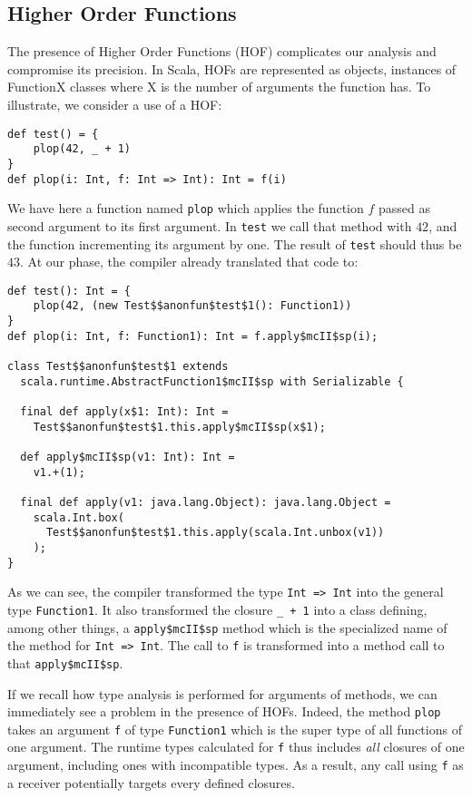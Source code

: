 \subsection{Higher Order Functions}
The presence of Higher Order Functions (HOF) complicates our analysis and
compromise its precision. In Scala, HOFs are represented as objects, instances
of FunctionX classes where X is the number of arguments the function has. To
illustrate, we consider a use of a HOF:
\begin{lstlisting}
def test() = {
    plop(42, _ + 1)
}
def plop(i: Int, f: Int => Int): Int = f(i)
\end{lstlisting}
We have here a function named \lstinline{plop} which applies the function $f$ passed
as second argument to its first argument. In \lstinline{test} we call that method
with $42$, and the function incrementing its argument by one. The result of
\lstinline{test} should thus be $43$. At our phase, the compiler already
translated that code to:
\begin{lstlisting}
def test(): Int = {
    plop(42, (new Test$$anonfun$test$1(): Function1))
}
def plop(i: Int, f: Function1): Int = f.apply$mcII$sp(i);

class Test$$anonfun$test$1 extends
  scala.runtime.AbstractFunction1$mcII$sp with Serializable {

  final def apply(x$1: Int): Int =
    Test$$anonfun$test$1.this.apply$mcII$sp(x$1);

  def apply$mcII$sp(v1: Int): Int =
    v1.+(1);

  final def apply(v1: java.lang.Object): java.lang.Object =
    scala.Int.box(
      Test$$anonfun$test$1.this.apply(scala.Int.unbox(v1))
    );
}

\end{lstlisting}
As we can see, the compiler transformed the type \lstinline{Int => Int} into
the general type \lstinline{Function1}. It also transformed the closure
\lstinline{_ + 1} into a class defining, among other things, a
\lstinline{apply$mcII$sp} method which is the specialized name of the method
for \lstinline{Int => Int}. The call to \lstinline{f} is transformed into a
method call to that \lstinline{apply$mcII$sp}.

If we recall how type analysis is performed for arguments of methods, we can
immediately see a problem in the presence of HOFs. Indeed, the method
\lstinline{plop} takes an argument \lstinline{f} of type \lstinline{Function1}
which is the super type of all functions of one argument. The runtime types
calculated for \lstinline{f} thus includes \emph{all} closures of one argument,
including ones with incompatible types. As a result, any call using
\lstinline{f} as a receiver potentially targets every defined closures.

